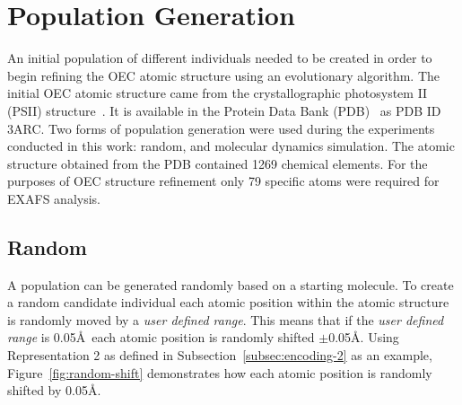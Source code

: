 \section{Population Generation}

An initial population of different individuals needed to be created in order to begin refining the OEC atomic structure using an evolutionary algorithm. The initial OEC atomic structure came from the crystallographic photosystem II (PSII) structure~\cite{umena2011crystal}. It is available in the Protein Data Bank (PDB)~\cite{databank} as PDB ID 3ARC. Two forms of population generation were used during the experiments conducted in this work: random, and molecular dynamics simulation. The atomic structure obtained from the PDB contained 1269 chemical elements. For the purposes of OEC structure refinement only 79 specific atoms were required for EXAFS analysis.


\subsection{Random}
\label{subsec:random-population}

A population can be generated randomly based on a starting molecule. To create a random candidate individual each atomic position within the atomic structure is randomly moved by a \textit{user defined range}. This means that if the \textit{user defined range} is 0.05\AA\ each atomic position is randomly shifted $\pm$0.05\AA. Using Representation 2 as defined in Subsection~\ref{subsec:encoding-2} as an example, Figure~\ref{fig:random-shift} demonstrates how each atomic position is randomly shifted by 0.05\AA.

